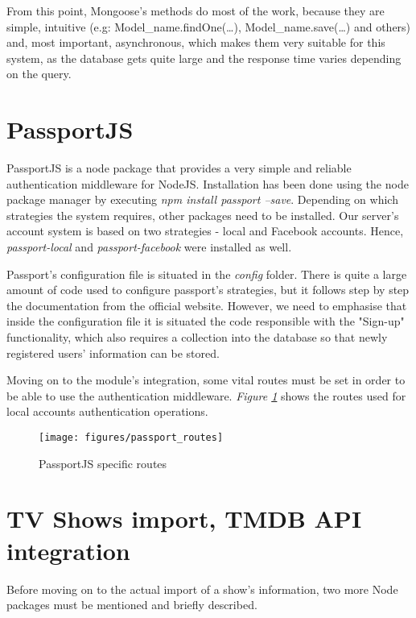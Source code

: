 From this point, Mongoose's methods do most of the work, because they are simple, intuitive (e.g: Model\_name.findOne(…), Model\_name.save(…) and others) and, most important, asynchronous, which makes them very suitable for this system, as the database gets quite large and the response time varies depending on the query.

\section{PassportJS}

PassportJS \cite{passport} is a node package that provides a very simple and reliable authentication middleware for NodeJS. Installation has been done using the node package manager by executing \textit{npm install passport --save}. Depending on which strategies the system requires, other packages need to be installed. Our server's account system is based on two strategies - local and Facebook accounts. Hence, \textit{passport-local} and \textit{passport-facebook} were installed as well.

Passport's configuration file is situated in the \textit{config} folder. There is quite a large amount of code used to configure passport's strategies, but it follows step by step the documentation from the official website. %
However, we need to emphasise that inside the configuration file it is situated the code responsible with the "Sign-up" functionality, which also requires a collection into the database so that newly registered users' information can be stored.

Moving on to the module's integration, some vital routes must be set in order to be able to use the authentication middleware. \textit{Figure \ref{fig:passportroutes}} shows the routes used for local accounts authentication operations.

\begin{figure}[h]
\centering
\texttt{[image: figures/passport\_routes]}
\caption{PassportJS specific routes}
\label{fig:passportroutes}
\end{figure}

\section{TV Shows import, TMDB API integration}

Before moving on to the actual import of a show's information, two more Node packages must be mentioned and briefly described.

